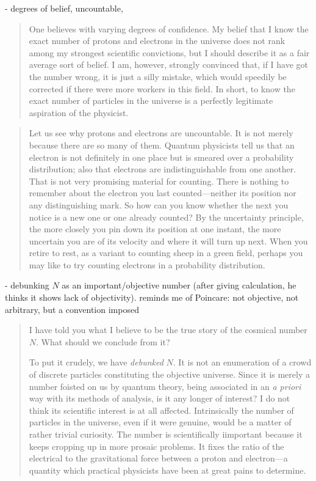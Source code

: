 - degrees of belief, uncountable, 

\begin{quote}
    One believes with varying degrees of confidence.  My belief that I know the exact number of protons and electrons in the universe does not rank among my strongest scientific convictions, but I should describe it as a fair average sort of belief.  I am, however, strongly convinced that, if I have got the number wrong, it is just a silly mistake, which would speedily be corrected if there were more workers in this field.  In short, to know the exact number of particles in the universe is a perfectly legitimate aspiration of the physicist.  \citep[p. 171]{Eddington1939}
\end{quote}

\begin{quote}
    Let us see why protons and electrons are uncountable.  It is not merely because there are so many of them.  Quantum physicists tell us that an electron is not definitely in one place but is smeared over a probability distribution; also that electrons are indistinguishable from one another.  That is not very promising material for counting.  There is nothing to remember about the electron you last counted---neither its position nor any distinguishing mark.  So how can you know whether the next you notice is a new one or one already counted?  By the uncertainty principle, the more closely you pin down its position at one instant, the more uncertain you are of its velocity and where it will turn up next.  When you retire to rest, as a variant to counting sheep in a green field, perhaps you may like to try counting electrons in a probability distribution.  \citep[p. 171-172]{Eddington1939}
\end{quote}


- debunking $N$ as an important/objective number (after giving calculation, he thinks it shows lack of objectivity).  reminds me of Poincare: not objective, not arbitrary, but a convention imposed

\begin{quote}
    I have told you what I believe to be the true story of the cosmical number $N$.  What should we conclude from it?

    To put it crudely, we have \emph{debunked} $N$.  It is not an enumeration of a crowd of discrete particles constituting the objective universe.  Since it is merely a number foisted on us by quantum theory, being associated in an \emph{a priori} way with its methods of analysis, is it any longer of interest?  I do not think its scientific interest is at all affected.  Intrinsically the number of particles in the universe, even if it were genuine, would be a matter of rather trivial curiosity.  The number is scientifically iimportant because it keeps cropping up in more prosaic problems.  It fixes the ratio of the electrical to the gravitational force between a proton and electron---a quantity which practical physicists have been at great pains to determine.  \citep[p. 177]{Eddington1939}
\end{quote}

